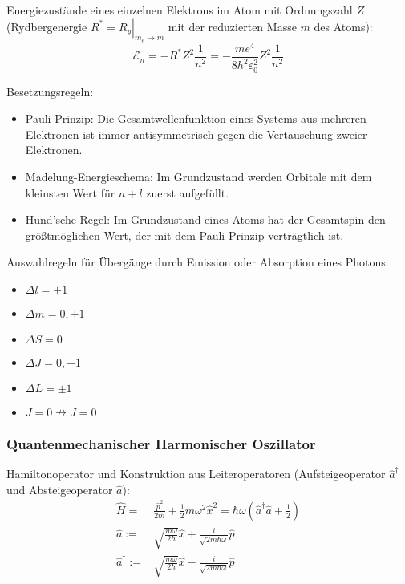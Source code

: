 \documentclass[11pt]{article}
\numberwithin{equation}{section}
\begin{document}
				\noindent
				Energiezustände eines einzelnen Elektrons im Atom mit Ordnungszahl $Z$ (Rydbergenergie $\left.R^*=R_y\right|_{m_e\rightarrow m}$ mit der reduzierten Masse $m$ des Atoms):
				\begin{equation}
					\mathcal{E}_n = -R^* Z^2 \frac{1}{n^2} = - \frac{m e^4}{8 h^2 \varepsilon_0^2} Z^2 \frac{1}{n^2}
				\end{equation}

				\noindent
				Besetzungsregeln:
				\begin{itemize}
					\item Pauli-Prinzip: Die Gesamtwellenfunktion eines Systems aus mehreren Elektronen ist immer antisymmetrisch	gegen die Vertauschung zweier Elektronen.
					\item Madelung-Energieschema: Im Grundzustand werden Orbitale mit dem kleinsten Wert für $n+l$ zuerst aufgefüllt.
					\item Hund'sche Regel: Im Grundzustand eines Atoms hat der Gesamtspin den größtmöglichen Wert, der mit dem Pauli-Prinzip verträgtlich ist.
				\end{itemize}

				\noindent
				Auswahlregeln für Übergänge durch Emission oder Absorption eines Photons:
				\begin{itemize}
					\item $\Delta l = \pm 1$
					\item $\Delta m = 0, \pm 1$
					\item $\Delta S = 0$
					\item $\Delta J = 0, \pm 1$
					\item $\Delta L = \pm 1$
					\item $J=0 \nrightarrow J=0$
				\end{itemize}

			\subsubsection{Quantenmechanischer Harmonischer Oszillator}
				\noindent
				Hamiltonoperator und Konstruktion aus Leiteroperatoren (Aufsteigeoperator $\hat{a}^\dagger$ und Absteigeoperator $\hat{a}$):
				\begin{equation}
					\begin{aligned}
						\hat{H} =& \frac{\hat{p}^2}{2m} + \frac{1}{2}m\omega^2 \hat{x}^2 = \hbar\omega(\hat{a}^\dagger \hat{a} + \frac{1}{2}) \\
						\hat{a} :=& \sqrt{\frac{m\omega}{2\hbar}}\hat{x} + \frac{i}{\sqrt{2m\hbar\omega}}\hat{p} \\
						\hat{a}^\dagger :=& \sqrt{\frac{m\omega}{2\hbar}}\hat{x} - \frac{i}{\sqrt{2m\hbar\omega}}\hat{p} \\
					\end{aligned}
				\end{equation}
\end{document}
